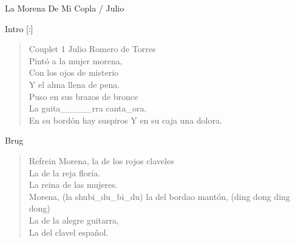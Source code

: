 \begin{song}{La Morena De Mi Copla / Julio}

\begin{instrumental}{Intro}
\measure*{}[:]
\measure{}
\end{instrumental}

\begin{verse}{Couplet 1}
Julio Romero de Torres\\
Pintó a la mujer morena,\\
Con los ojos de misterio\chord{}\\
Y el alma llena de pena.\\
Puso en sus brazos\phantom{x}\phantom{xxx} de bronce\\
La guita\_\_\_\_\_rra canta\_ora.\\
En su bordón hay suspiros\hspace{4em}
Y en su caja una dolora.\\
\end{verse}

\begin{instrumental}{Brug}
\measure{}\measure{}\measure{}
\end{instrumental}

\begin{verse}{Refrein}
\hspace{6ex}Morena, la de los rojos claveles\\
La de la reja floría.\\
La reina de las\hspace{\wlskip} mujeres. \\
Morena, \small{(la shubi\_du\_bi\_du)} la del bordao mantón, \small{(ding dong ding dong)}\\
La de la alegre guitarra, \\
La del clavel español.
\end{verse}


\end{song}

